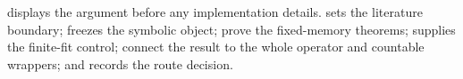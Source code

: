  displays the argument before any implementation
details.   sets the literature boundary;
 freezes the symbolic object;
 prove the fixed-memory theorems;
 supplies the finite-fit control;
 connect the result to the whole operator
and countable wrappers; and  records the route decision.
